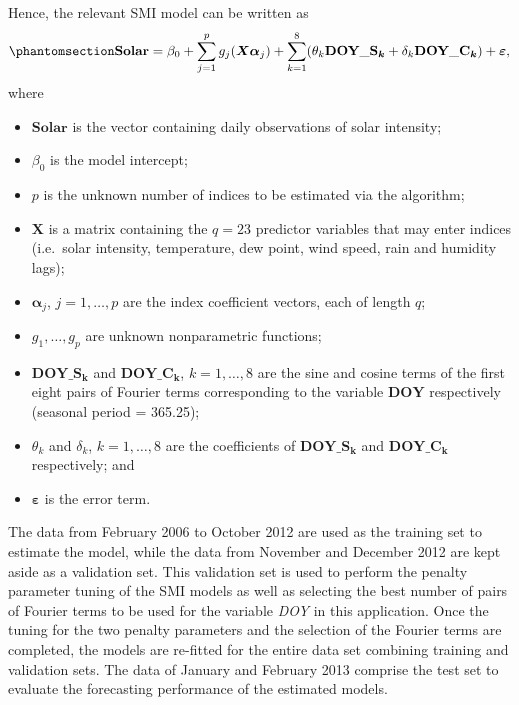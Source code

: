 \documentclass[
  11pt,
  a4paper,
]{article}
\providecommand{\tightlist}{%
  \setlength{\itemsep}{0pt}\setlength{\parskip}{0pt}}\usepackage{longtable,booktabs,array}
\begin{document}
Hence, the relevant SMI model can be written as
\begin{equation}\phantomsection\label{eq-solar}{
  \textbf{Solar} = \beta_{0} + \sum_{j = 1}^{p}{g_{j}(\bm{X}\bm{\alpha}_{j})} + \sum_{k = 1}^{8}(\theta_{k}\textbf{DOY}\_\textbf{S}_{\bm{k}} + \delta_{k}\textbf{DOY}\_\textbf{C}_{\bm{k}}) + \bm{\varepsilon},
}\end{equation} where

\begin{itemize}
\tightlist
\item
  \(\textbf{Solar}\) is the vector containing daily observations of
  solar intensity;
\item
  \(\beta_{0}\) is the model intercept;
\item
  \(p\) is the unknown number of indices to be estimated via the
  algorithm;
\item
  \(\bm{X}\) is a matrix containing the \(q=23\) predictor variables
  that may enter indices (i.e.~solar intensity, temperature, dew point,
  wind speed, rain and humidity lags);
\item
  \(\bm{\alpha}_{j}\), \(j = 1, \dots, p\) are the index coefficient
  vectors, each of length \(q\);
\item
  \(g_{1}, \dots, g_{p}\) are unknown nonparametric functions;
\item
  \(\textbf{DOY}\_\textbf{S}_{\bm{k}}\) and
  \(\textbf{DOY}\_\textbf{C}_{\bm{k}}\), \(k = 1, \dots, 8\) are the
  sine and cosine terms of the first eight pairs of Fourier terms
  corresponding to the variable \(\textbf{DOY}\) respectively (seasonal
  period = 365.25);
\item
  \(\theta_{k}\) and \(\delta_{k}\), \(k = 1, \dots, 8\) are the
  coefficients of \(\textbf{DOY}\_\textbf{S}_{\bm{k}}\) and
  \(\textbf{DOY}\_\textbf{C}_{\bm{k}}\) respectively; and
\item
  \(\bm{\varepsilon}\) is the error term.
\end{itemize}

The data from February 2006 to October 2012 are used as the training set
to estimate the model, while the data from November and December 2012
are kept aside as a validation set. This validation set is used to
perform the penalty parameter tuning of the SMI models as well as
selecting the best number of pairs of Fourier terms to be used for the
variable \emph{DOY} in this application. Once the tuning for the two
penalty parameters and the selection of the Fourier terms are completed,
the models are re-fitted for the entire data set combining training and
validation sets. The data of January and February 2013 comprise the test
set to evaluate the forecasting performance of the estimated models.
\end{document}
